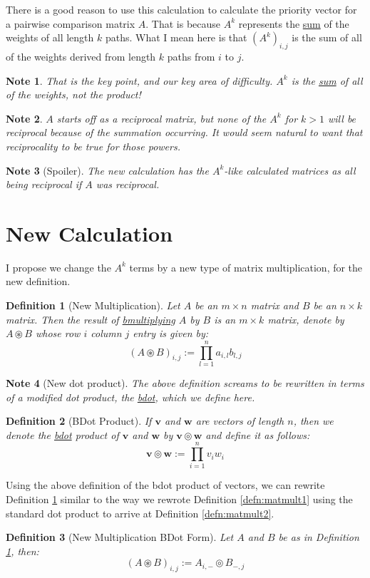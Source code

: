 \documentclass[12pt]{article}
\newtheorem{definition}{Definition}
\newtheorem{note}{Note}
\begin{document}
There is a good reason to use this calculation to calculate the priority
vector for a pairwise comparison matrix $A$.  That is because $A^k$
represents the \ul{sum} of the weights of all length $k$ paths.  What
I mean here is that $(A^k)_{i,j}$ is the sum of all of the weights derived
from length $k$ paths from $i$ to $j$.

\begin{note}
That is the key point, and our key area of difficulty.  $A^k$ is
the \ul{sum} of all of the weights, not the product!
\end{note}

\begin{note}
$A$ starts off as a reciprocal matrix, but none of the $A^k$ for $k>1$
will be reciprocal because of the summation occurring.  It would seem
natural to want that reciprocality to be true for those powers.	
\end{note}

\begin{note}[Spoiler]
The new calculation has the $A^k$-like calculated matrices as all
being reciprocal if $A$ was reciprocal.	
\end{note}

\section{New Calculation}
I propose we change the $A^k$ terms by a new type of matrix multiplication,
for the new definition.
\begin{definition}[New Multiplication]
\label{defn:bmatmult1}
Let $A$ be an $m \times n$ matrix and $B$ be an $n \times k$ matrix.  
Then the result of \ul{bmultiplying} $A$ by $B$ is an $m \times k$ matrix,
denote by $A\circledast B$ whose row $i$ column $j$ entry is given by:
\begin{equation}
(A\circledast B)_{i,j} := \prod_{l=1}^{n} a_{i,l}b_{l,j}
\label{eqn:bmatmult1}
\end{equation}
\end{definition}
\begin{note}[New dot product]
The above definition screams to be rewritten in terms of a modified
dot product, the \ul{bdot}, which we define here.	
\end{note}
\begin{definition}[BDot Product]
	If $\mathbf{v}$ and $\mathbf{w}$ are vectors of length $n$, then we
	denote the \ul{bdot} product of $\mathbf{v}$ and $\mathbf{w}$ by
	$\mathbf{v}\circledcirc \mathbf{w}$ and define it as follows:
	$$
	\mathbf{v} \circledcirc \mathbf{w}:= \prod_{i=1}^n v_i w_i
	$$
\end{definition}
Using the above definition of the bdot product of vectors, we can
rewrite Definition \ref{defn:bmatmult1} similar to the way
we rewrote Definition \ref{defn:matmult1} using the standard dot product
to arrive at Definition \ref{defn:matmult2}.

\begin{definition}[New Multiplication BDot Form]
	\label{defn:bmatmult2}
	Let $A$ and $B$ be as in Definition \ref{defn:bmatmult1}, then:
	$$(A\circledast B)_{i,j} := A_{i,-} \circledcirc B_{-,j}$$

\end{definition}
\end{document}
